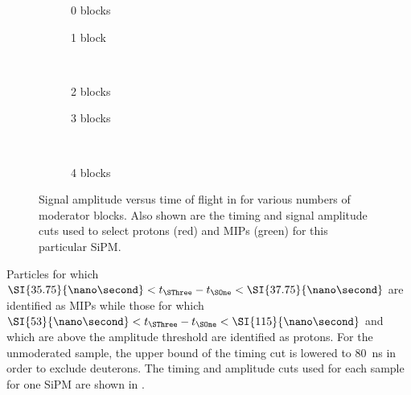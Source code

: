 \begin{figure}[t]
  \begin{subfigure}[t]{.5\textwidth}
    \begin{adjustbox}{max totalsize=\textwidth, center}
      
    \end{adjustbox}
    \caption{0 blocks}
    \label{fig:tvsa:0}
  \end{subfigure}
  \hfill
  \begin{subfigure}[t]{.5\textwidth}
    \begin{adjustbox}{max totalsize=\textwidth, center}
            
    \end{adjustbox}
    \caption{1 block}
  \end{subfigure} \\
  \begin{subfigure}[t]{.5\textwidth}
    \begin{adjustbox}{max totalsize=\textwidth, center}
      
    \end{adjustbox}
    \caption{2 blocks}
  \end{subfigure}
  \hfill
  \begin{subfigure}[t]{.5\textwidth}
    \begin{adjustbox}{max totalsize=\textwidth, center}
      
    \end{adjustbox}
    \caption{3 blocks}
  \end{subfigure} \\

  \begin{subfigure}[t]{\textwidth}
    \begin{adjustbox}{max totalsize=.5\textwidth, center}
      
    \end{adjustbox}
    \caption{4 blocks}
  \end{subfigure}

  \caption[Signal amplitude versus time of flight in \SThree]{Signal amplitude versus time of flight in \SThree for various numbers of moderator blocks. Also shown are the timing and signal amplitude cuts used to select protons (red) and MIPs (green) for this particular SiPM.}
  \label{fig:tvsa}
\end{figure}

Particles for which $\SI{35.75}{\nano\second} < t_{\SThree} - t_{\SOne} < \SI{37.75}{\nano\second}$ are identified as MIPs while those for which $\SI{53}{\nano\second} < t_{\SThree} - t_{\SOne} < \SI{115}{\nano\second}$ and which are above the amplitude threshold are identified as protons.
For the unmoderated sample, the upper bound of the timing cut is lowered to \SI{80}{\nano\second} in order to exclude deuterons.
The timing and amplitude cuts used for each sample for one SiPM are shown in .

